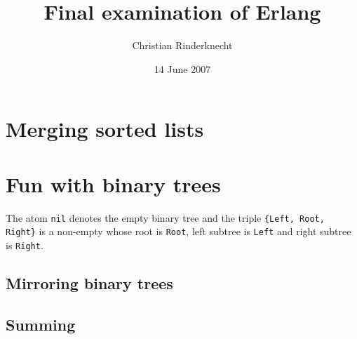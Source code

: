 \documentclass[11pt, a4paper]{article}
\title{Final examination of Erlang}
\author{Christian Rinderknecht}
\date{14 June 2007}
\begin{document}
\maketitle

\thispagestyle{empty}

\section{Merging sorted lists}




\section{Fun with binary trees}

The atom \texttt{nil} denotes the empty binary tree and the triple
\texttt{\{Left, Root, Right\}} is a non\hyp{}empty whose root is
\texttt{Root}, left subtree is \texttt{Left} and right subtree is
\texttt{Right}.

\subsection{Mirroring binary trees}




\subsection{Summing}



\end{document}
